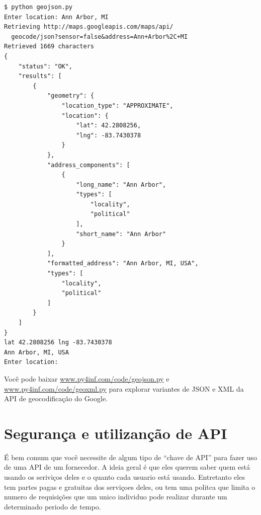 \beforeverb
\begin{verbatim}
$ python geojson.py
Enter location: Ann Arbor, MI
Retrieving http://maps.googleapis.com/maps/api/
  geocode/json?sensor=false&address=Ann+Arbor%2C+MI
Retrieved 1669 characters
{
    "status": "OK", 
    "results": [
        {
            "geometry": {
                "location_type": "APPROXIMATE", 
                "location": {
                    "lat": 42.2808256, 
                    "lng": -83.7430378
                }
            }, 
            "address_components": [
                {
                    "long_name": "Ann Arbor", 
                    "types": [
                        "locality", 
                        "political"
                    ], 
                    "short_name": "Ann Arbor"
                } 
            ], 
            "formatted_address": "Ann Arbor, MI, USA", 
            "types": [
                "locality", 
                "political"
            ]
        }
    ]
}
lat 42.2808256 lng -83.7430378
Ann Arbor, MI, USA
Enter location:
\end{verbatim}
\afterverb
%
Você pode baixar
\url{www.py4inf.com/code/geojson.py} e
\url{www.py4inf.com/code/geoxml.py} para explorar
variantes de JSON e XML da API de geocodificação do Google.

\section{Segurança e utilizanção de API}

É bem comum que você necessite de algum tipo de 
``chave de API'' para fazer uso de uma API de um fornecedor.
A ideia geral é que eles querem saber quem está usando os
seriviços deles e o quanto cada usuario está usando.
Entretanto eles tem partes pagas e gratuitas dos serviçoes
deles, ou tem uma politca que limita o numero de requisições
que um unico individuo pode realizar durante um determinado
periodo de tempo.

